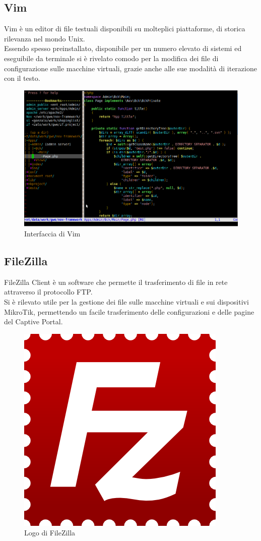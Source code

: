 \documentclass[Tesi.tex]{subfiles}
\begin{document}
\subsection{Vim}
Vim è un editor di file testuali disponibili su molteplici piattaforme, di storica rilevanza nel mondo Unix. \\
Essendo spesso preinstallato, disponibile per un numero elevato di sistemi ed eseguibile da terminale si è rivelato comodo per la modifica dei file di configurazione sulle macchine virtuali, grazie anche alle sue modalità di iterazione con il testo.
\begin{figure}[H]
	\centering
	\includegraphics[width=0.75\linewidth]{"images/vim"}
	\caption{Interfaccia di Vim}
	\label{fig:Interfaccia di Vim}
\end{figure}


\subsection{FileZilla}
FileZilla Client è un software che permette il trasferimento di file in rete attraverso il protocollo FTP. \\
Si è rilevato utile per la gestione dei file sulle macchine virtuali e sui dispositivi MikroTik, permettendo un facile trasferimento delle configurazioni e delle pagine del Captive Portal.
\begin{figure}[H]
	\centering
	\includegraphics[width=0.22\linewidth]{"images/logo/Filezilla_logo"}
	\caption{Logo di FileZilla}
	\label{fig:Logo di FileZilla}
\end{figure}
\end{document}
